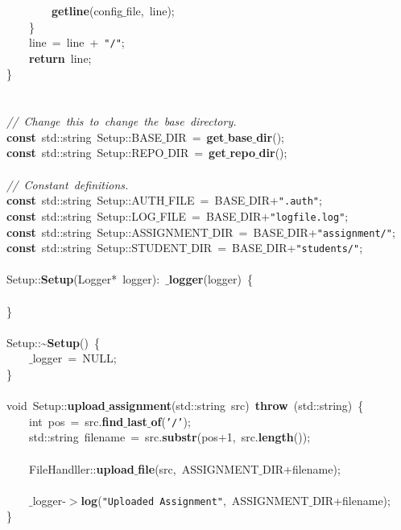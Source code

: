 \mbox{}\ \ \ \ \ \ \ \ \textbf{getline}(config$\_$file,\ line); \\
\mbox{}\ \ \ \ \} \\
\mbox{}\ \ \ \ line\ =\ line\ +\ \texttt{"{}/"{}}; \\
\mbox{}\ \ \ \ \textbf{return}\ line; \\
\mbox{}\} \\
\mbox{} \\
\mbox{} \\
\mbox{}\textit{//\ Change\ this\ to\ change\ the\ base\ directory.} \\
\mbox{}\textbf{const}\ std::string\ Setup::BASE$\_$DIR\ =\ \textbf{get$\_$base$\_$dir}(); \\
\mbox{}\textbf{const}\ std::string\ Setup::REPO$\_$DIR\ =\ \textbf{get$\_$repo$\_$dir}(); \\
\mbox{} \\
\mbox{}\textit{//\ Constant\ definitions.} \\
\mbox{}\textbf{const}\ std::string\ Setup::AUTH$\_$FILE\ =\ BASE$\_$DIR+\texttt{"{}.auth"{}}; \\
\mbox{}\textbf{const}\ std::string\ Setup::LOG$\_$FILE\ =\ BASE$\_$DIR+\texttt{"{}logfile.log"{}}; \\
\mbox{}\textbf{const}\ std::string\ Setup::ASSIGNMENT$\_$DIR\ =\ BASE$\_$DIR+\texttt{"{}assignment/"{}}; \\
\mbox{}\textbf{const}\ std::string\ Setup::STUDENT$\_$DIR\ =\ BASE$\_$DIR+\texttt{"{}students/"{}}; \\
\mbox{} \\
\mbox{}Setup::\textbf{Setup}(Logger*\ logger):\ \textbf{$\_$logger}(logger)\ \{ \\
\mbox{} \\
\mbox{}\} \\
\mbox{} \\
\mbox{}Setup::\textasciitilde{}\textbf{Setup}()\ \{ \\
\mbox{}\ \ \ \ $\_$logger\ =\ NULL; \\
\mbox{}\} \\
\mbox{} \\
\mbox{}void\ Setup::\textbf{upload$\_$assignment}(std::string\ src)\ \textbf{throw}\ (std::string)\ \{ \\
\mbox{}\ \ \ \ int\ pos\ =\ src.\textbf{find$\_$last$\_$of}(\texttt{'/'}); \\
\mbox{}\ \ \ \ std::string\ filename\ =\ src.\textbf{substr}(pos+1,\ src.\textbf{length}()); \\
\mbox{} \\
\mbox{}\ \ \ \ FileHandller::\textbf{upload$\_$file}(src,\ ASSIGNMENT$\_$DIR+filename); \\
\mbox{}\ \ \ \  \\
\mbox{}\ \ \ \ $\_$logger-$>$\textbf{log}(\texttt{"{}Uploaded\ Assignment"{}},\ ASSIGNMENT$\_$DIR+filename); \\
\mbox{}\} \\

